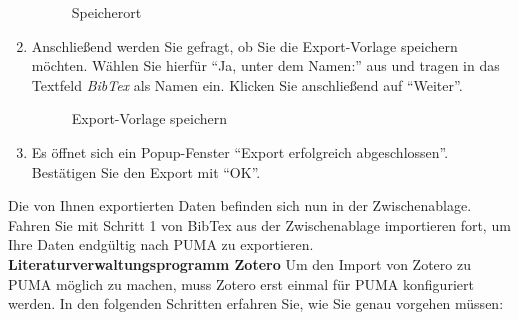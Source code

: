 \begin{enumerate}
\begin{figure}[h!]
 \centering
 \caption{Speicherort}
 \label{fig:speicherort}
\end{figure}
    \item Anschließend werden Sie gefragt, ob Sie die Export-Vorlage speichern möchten. Wählen Sie hierfür \enquote{Ja, unter dem Namen:} aus und tragen in das Textfeld \textit{BibTex} als Namen ein. Klicken Sie anschließend auf \enquote{Weiter}.
   
\begin{figure}[h!]
 \centering
 \caption{Export-Vorlage speichern}
 \label{fig:exportVorlageSpeichern}
\end{figure}
    \item Es öffnet sich ein Popup-Fenster \enquote{Export erfolgreich abgeschlossen}. Bestätigen Sie den Export mit \enquote{OK}.
\end{enumerate}
Die von Ihnen exportierten Daten befinden sich nun in der Zwischenablage. Fahren Sie mit Schritt 1 von BibTex aus der Zwischenablage importieren fort, um Ihre Daten endgültig nach PUMA zu exportieren.\newline
\newline
\textbf{Literaturverwaltungsprogramm Zotero} \label{importZotero}
\newline \newline
Um den Import von Zotero zu PUMA möglich zu machen, muss Zotero erst einmal für PUMA konfiguriert werden. In den folgenden Schritten erfahren Sie, wie Sie genau vorgehen müssen:
